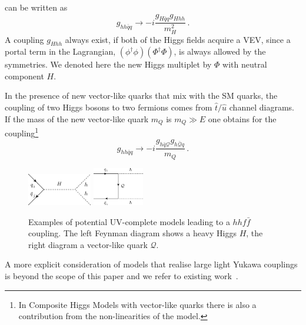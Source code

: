 can be written as
\begin{equation}
	g_{hh\bar{q}q} \to -i \frac{g_{H\bar{q}q} g_{Hhh}}{m_H^2}\,.
\end{equation}
A coupling $g_{Hhh}$ always exist, if both of the Higgs fields acquire a VEV, since a portal term in the Lagrangian, $(\phi^{\dagger} \phi) (\Phi^{\dagger}\Phi)$, is always allowed  by the symmetries. We denoted here the new Higgs multiplet by $\Phi$ with neutral component $H$.
\par
In the presence of new vector-like quarks that mix with the SM quarks, the coupling of two Higgs bosons to two fermions comes from $\hat{t}/\hat{u}$ channel diagrams. If the mass of the new vector-like quark $m_Q$ is $m_Q\gg E$ one obtains for the coupling\footnote{In Composite Higgs Models with vector-like quarks there is also a contribution from the non-linearities of the model.}
\begin{equation}
	g_{hh\bar{q}q} \to -i \frac{g_{h\bar{q}\mathcal Q}g_{h\bar{\mathcal Q}q}}{m_Q}\,.
\end{equation}
%
\begin{figure}[!t]
	\centering
	\includegraphics[width = 0.25\textwidth]{./fig/qqh_2hdm}
	\hspace{0.5 cm}
	\includegraphics[width = 0.2\textwidth]{./fig/VLQ}
	\caption{Examples of potential UV-complete models leading to a  $hh f \bar{f} $ coupling. The left Feynman diagram shows a heavy Higgs $H$, the right diagram a vector-like quark $\mathcal Q $.} %
	\label{fig_uv_qqhh}
\end{figure}
%
A more explicit consideration of models that realise large light Yukawa couplings is beyond the scope of this paper and we refer to existing work~\cite{Bar-Shalom:2018rjs, Egana-Ugrinovic:2019dqu}.

